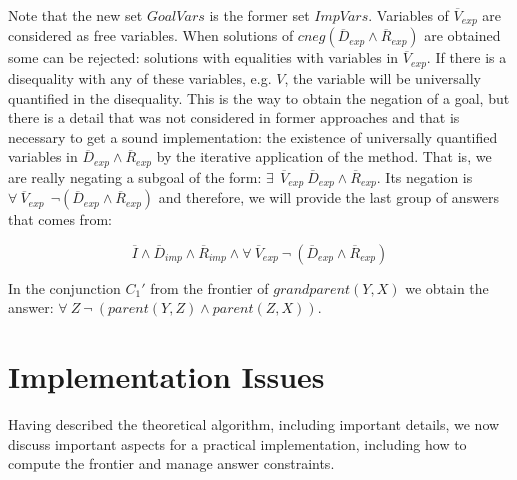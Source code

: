 \documentclass{tlp}
\begin{document}
\begin{itemize}
           Note that the new set $GoalVars$ is the former set
           $ImpVars$. Variables of $\overline{V}_{exp}$ are considered
           as free variables. When solutions of
           $cneg(\overline{D}_{exp} \wedge \overline{R}_{exp})$ are
           obtained some can be rejected: solutions with equalities
           with variables in $\overline{V}_{exp}$. If there is a
           disequality with any of these variables, e.g. $V$, the
           variable will be universally quantified in the disequality.
           This is the way to obtain the negation of a goal, but there
           is a detail that was not considered in former approaches
           and that is necessary to get a sound implementation: the
           existence of universally quantified variables in
           $\overline{D}_{exp} \wedge \overline{R}_{exp}$ by the
           iterative application of the method. That is, we are really
           negating a subgoal of the form: $ \exists~~
           \overline{V}_{exp}~ \overline{D}_{exp} \wedge
           \overline{R}_{exp}$. Its negation is $\forall~
           \overline{V}_{exp}~~ \neg(\overline{D}_{exp} \wedge
           \overline{R}_{exp})$ and therefore, we will provide the
           last group of answers that comes from:

           \[\overline{I} \wedge \overline{D}_{imp}
           \wedge \overline{R}_{imp} \wedge \forall~
           \overline{V}_{exp}~ \neg~(\overline{D}_{exp} \wedge
           \overline{R}_{exp})\]

	   In the conjunction $C_1'$ from the frontier of $grandparent(Y,X)$
           we obtain the answer: $\forall~ Z ~ \neg~(parent(Y,Z) \wedge
           parent(Z,X))$.

         \end{itemize}


    


\section{Implementation Issues}
\label{implementation}

Having described the theoretical algorithm, including important
details, we now discuss important aspects for a practical
implementation, including how to compute the frontier and manage
answer constraints.
\end{document}
